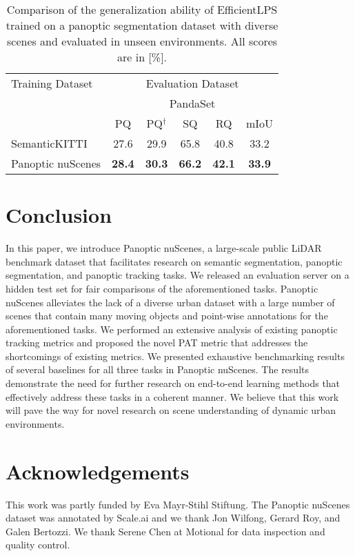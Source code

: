 \documentclass[letterpaper, 10 pt, journal, twoside]{IEEEtran}
\begin{document}
\begin{table}
\centering
\caption{Comparison of the generalization ability of EfficientLPS trained on a panoptic segmentation dataset with diverse scenes and evaluated in unseen environments. All scores are in [\%].}
\label{tab:generalization}
\footnotesize
\begin{tabular}{l|ccccc}
\toprule
Training Dataset & \multicolumn{5}{c}{Evaluation Dataset} \\
\cmidrule{2-6}
&  \multicolumn{5}{c}{PandaSet} \\
\cmidrule{2-6}
& PQ & PQ$^\dagger$ & SQ & RQ & mIoU  \\ 
\toprule
SemanticKITTI & 27.6 & 29.9 & 65.8 & 40.8 & 33.2\\
Panoptic nuScenes & \textbf{28.4} & \textbf{30.3} & \textbf{66.2} & \textbf{42.1} & \textbf{33.9}\\
\bottomrule
\end{tabular}
\vspace{-0.3cm}
\end{table} 
\section{Conclusion}

In this paper, we introduce Panoptic nuScenes, a large-scale public LiDAR benchmark dataset that facilitates research on semantic segmentation, panoptic segmentation, and panoptic tracking tasks. We released an evaluation server on a hidden test set for fair comparisons of the aforementioned tasks. Panoptic nuScenes alleviates the lack of a diverse urban dataset with a large number of scenes that contain many moving objects and point-wise annotations for the aforementioned tasks. We performed an extensive analysis of existing panoptic tracking metrics and proposed the novel PAT metric that addresses the shortcomings of existing metrics. We presented exhaustive benchmarking results of several baselines for all three tasks in Panoptic nuScenes. The results demonstrate the need for further research on end-to-end learning methods that effectively address these tasks in a coherent manner. We believe that this work will pave the way for novel research on scene understanding of dynamic urban environments. 
\section*{Acknowledgements}

This work was partly funded by Eva Mayr-Stihl Stiftung. The Panoptic nuScenes dataset was annotated by Scale.ai and we thank Jon Wilfong, Gerard Roy, and Galen Bertozzi. We thank Serene Chen at Motional for data inspection and quality control.
\end{document}
